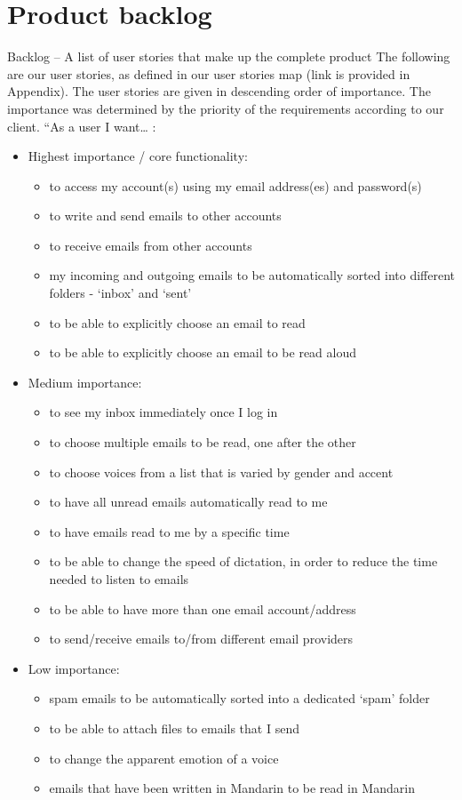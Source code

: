 \documentclass{article}
\begin{document}
\section{Product backlog}
Backlog – A list of user stories that make up the complete product
The following are our user stories, as defined in our user stories map (link is provided in Appendix). The user stories are given in descending order of importance. The importance was determined by the priority of the requirements according to our client. 
 “As a user I want… :
\begin{itemize}
  \item Highest importance / core functionality:
  \begin{itemize}
    \item to access my account(s) using my email address(es) and password(s)
    \item to write and send emails to other accounts
    \item to receive emails from other accounts
    \item my incoming and outgoing emails to be automatically sorted into different folders - ‘inbox’ and ‘sent’
    \item to be able to explicitly choose an email to read
    \item to be able to explicitly choose an email to be read aloud
  \end{itemize}
  \item Medium importance:
   \begin{itemize}
   \item to see my inbox immediately once I log in
   \item to choose multiple emails to be read, one after the other
   \item to choose voices from a list that is varied by gender and accent
   \item to have all unread emails automatically read to me
   \item to have emails read to me by a specific time
   \item to be able to change the speed of dictation, in order to reduce the time needed to listen to emails
   \item to be able to have more than one email account/address
   \item to send/receive emails to/from different email providers
   \end{itemize}
    \item Low importance:
   \begin{itemize}
   \item spam emails to be automatically sorted into a dedicated ‘spam’ folder
   \item to be able to attach files to emails that I send
   \item to change the apparent emotion of a voice
   \item emails that have been written in Mandarin to be read in Mandarin
   \end{itemize}
\end{itemize}
\end{document}
